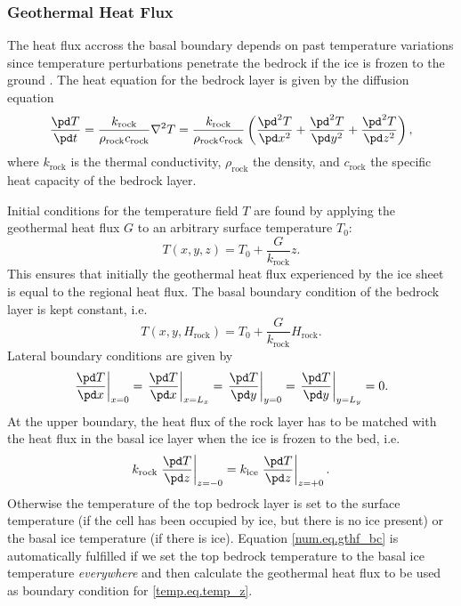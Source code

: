 \subsubsection{Geothermal Heat Flux}
The heat flux accross the basal boundary depends on past temperature variations since temperature perturbations penetrate the bedrock if the ice is frozen to the ground \citep{Ritz1987}. 
The heat equation for the bedrock layer is given by the diffusion equation
\begin{equation}
  \label{num.eq.diffu_rock}
  \frac{\pd T}{\pd t} = \frac{k_{\text{rock}}}{\rho_{\text{rock}}c_{\text{rock}}}\nabla^2T=\frac{k_{\text{rock}}}{\rho_{\text{rock}}c_{\text{rock}}} 
  \left(\frac{\pd^2 T}{\pd x^2}+\frac{\pd^2 T}{\pd y^2}+\frac{\pd^2 T}{\pd z^2}\right),
\end{equation}
where $k_{\text{rock}}$ is the thermal conductivity, $\rho_{\text{rock}}$ the density, and $c_{\text{rock}}$ the specific heat capacity of the bedrock layer. 

Initial conditions for the temperature field $T$ are found by applying the geothermal heat flux $G$ to an arbitrary surface temperature $T_0$:
\begin{equation}
  T(x,y,z)=T_0+\frac{G}{k_{\text{rock}}}z.
\end{equation}
This ensures that initially the geothermal heat flux experienced by the ice sheet is equal to the regional heat flux. The basal boundary condition of the bedrock layer is kept constant, i.e.
\begin{equation}
  T(x,y,H_{\text{rock}})=T_0+\frac{G}{k_{\text{rock}}}H_{\text{rock}}.
\end{equation}
Lateral boundary conditions are given by
\begin{equation}
  \left.\frac{\pd T}{\pd x}\right|_{x=0} = \left.\frac{\pd T}{\pd x}\right|_{x=L_x} = \left.\frac{\pd T}{\pd y}\right|_{y=0} = \left.\frac{\pd T}{\pd y}\right|_{y=L_y} = 0.
\end{equation}
At the upper boundary, the heat flux of the rock layer has to be matched with the heat flux in the basal ice layer when the ice is frozen to the bed, i.e.
\begin{equation}
  \label{num.eq.gthf_bc}
  k_{\text{rock}}\left.\frac{\pd T}{\pd z}\right|_{z=-0}=k_{\text{ice}}\left.\frac{\pd T}{\pd z}\right|_{z=+0}.
\end{equation}
Otherwise the temperature of the top bedrock layer is set to the surface temperature (if the cell has been occupied by ice, but there is no ice present) or the basal ice temperature (if there is ice). Equation \eqref{num.eq.gthf_bc} is automatically fulfilled if we set the top bedrock temperature to the basal ice temperature \emph{everywhere} and then calculate the geothermal heat flux to be used as boundary condition for \eqref{temp.eq.temp_z}.



